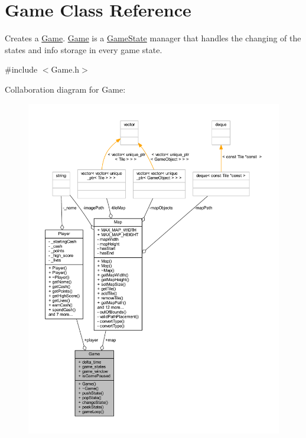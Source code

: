 \hypertarget{class_game}{\section{Game Class Reference}
\label{class_game}
}


Creates a \hyperlink{class_game}{Game}. \hyperlink{class_game}{Game} is a \hyperlink{class_game_state}{Game\+State} manager that handles the changing of the states and info storage in every game state.  




{\ttfamily \#include $<$Game.\+h$>$}



Collaboration diagram for Game\+:
\nopagebreak
\begin{figure}[H]
\begin{center}
\leavevmode
\includegraphics[width=350pt]{class_game__coll__graph}
\end{center}
\end{figure}
